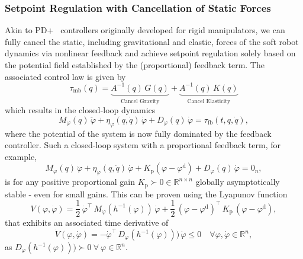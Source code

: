 \subsubsection{Setpoint Regulation with Cancellation of Static Forces}
Akin to PD+~\citep{paden1988globally, kelly1996class} controllers originally developed for rigid manipulators, we can fully cancel the static, including gravitational and elastic, forces of the soft robot dynamics via nonlinear feedback and achieve setpoint regulation solely based on the potential field established by the (proportional) feedback term. The associated control law is given by~\citep{patterson2024design, pustina2025analysis}
\begin{equation}
    \tau_\mathrm{mb}(q) =  \underbrace{A^{-1}(q) \, G(q)}_\text{Cancel Gravity} + \underbrace{A^{-1}(q) \, K(q)}_\text{Cancel Elasticity}
\end{equation}
which results in the closed-loop dynamics
\begin{equation}
    M_\varphi(q) \, \ddot{\varphi} + \eta_\varphi(q,\dot{q}) \, \dot{\varphi} + D_\varphi(q) \, \dot{\varphi} = \tau_\mathrm{fb}(t, q, \dot{q}),
\end{equation}
where the potential of the system is now fully dominated by the feedback controller.
Such a closed-loop system with a proportional feedback term, for example,
\begin{equation}
    M_\varphi(q) \, \ddot{\varphi} + \eta_\varphi(q,\dot{q}) \, \dot{\varphi} +  K_\mathrm{p} ( \varphi - \varphi^\mathrm{d}) + D_\varphi(q) \, \dot{\varphi} = 0_n,
\end{equation}
is for any positive proportional gain $K_\mathrm{p} \succ 0 \in \mathbb{R}^{n \times n}$ globally asymptotically stable - even for small gains.
This can be proven using the Lyapunov function
\begin{equation}
    V(\varphi,\dot{\varphi}) = \frac{1}{2} \, \dot{\varphi}^\top \, M_\varphi(h^{-1}(\varphi)) \, \dot{\varphi} + \frac{1}{2} \, \left (\varphi - \varphi^\mathrm{d} \right )^\top \, K_\mathrm{p} \, \left (\varphi - \varphi^\mathrm{d} \right ),
\end{equation}
that exhibits an associated time derivative of
\begin{equation}
    \dot{V}(\varphi, \dot{\varphi}) = - \dot{\varphi}^\top \, D_\varphi(h^{-1}(\varphi))) \, \dot{\varphi} \leq 0 \quad \forall \varphi, \dot{\varphi} \in \mathbb{R}^n,
\end{equation}
as $D_\varphi(h^{-1}(\varphi))) \succ 0 \: \forall \: \varphi \in \mathbb{R}^n$. 
